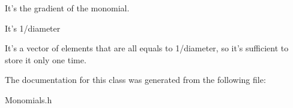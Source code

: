 \-It's the gradient of the monomial. 

\-It's 1/diameter

\-It's a vector of elements that are all equals to 1/diameter, so it's sufficient to store it only one time. 

\-The documentation for this class was generated from the following file\-:\begin{DoxyCompactItemize}
\item 
\-Monomials.\-h\end{DoxyCompactItemize}
